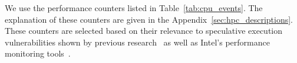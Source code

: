 


We use the performance counters listed in Table~\ref{tab:cpu_events}. The explanation of these counters are given in the Appendix~\ref{sec:hpc_descriptions}. 
These counters are selected based on their relevance to speculative execution vulnerabilities shown by previous research~\cite{ragab2021rage,oleksenko2023hide,chakraborty2024shesha} as well as Intel's performance monitoring tools~\cite{intel_perfmon}.

